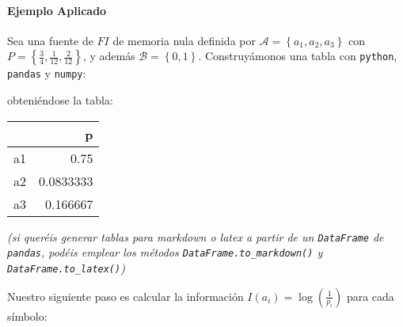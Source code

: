 \paragraph{Ejemplo Aplicado}\label{ejemplo-aplicado}

Sea una fuente de \(FI\) de memoria nula definida por
\(\mathcal{A}=\left\{a_1,a_2,a_3\right\}\) con
\(P=\left\{\frac{3}{4},\frac{1}{12},\frac{2}{12}\right\}\), y además
\(\mathcal{B}=\left\{0,1\right\}\). Construyámonos una tabla con
\texttt{python}, \texttt{pandas} y \texttt{numpy}:

\begin{Shaded}
\begin{Highlighting}[]
\OperatorTok{=}
\NormalTok{    np.array([[}\OperatorTok{/}\NormalTok{, }\OperatorTok{/}\NormalTok{, }\OperatorTok{/}\NormalTok{]]).T,}
\OperatorTok{=}\NormalTok{[}\NormalTok{],}
\OperatorTok{=}\NormalTok{[}\NormalTok{,}\NormalTok{,}\NormalTok{]}
\NormalTok{)}
\end{Highlighting}
\end{Shaded}

obteniéndose la tabla:

\begin{longtable}[]{@{}lr@{}}
\toprule\noalign{}
& p \\
\midrule\noalign{}
\endhead
\bottomrule\noalign{}
\endlastfoot
a1 & 0.75 \\
a2 & 0.0833333 \\
a3 & 0.166667 \\
\end{longtable}

\emph{(si queréis generar tablas para markdown o latex a partir de un
\texttt{DataFrame} de \texttt{pandas}, podéis emplear los métodos
\texttt{DataFrame.to\_markdown()} y \texttt{DataFrame.to\_latex()})}

Nuestro siguiente paso es calcular la información
\(I(a_i) = \log\left(\frac{1}{p_i}\right)\) para cada símbolo:

\begin{Shaded}
\begin{Highlighting}[]
\NormalTok{df[}\NormalTok{] }\OperatorTok{=}\OperatorTok{/}\NormalTok{df[}\NormalTok{])}
\end{Highlighting}
\end{Shaded}

